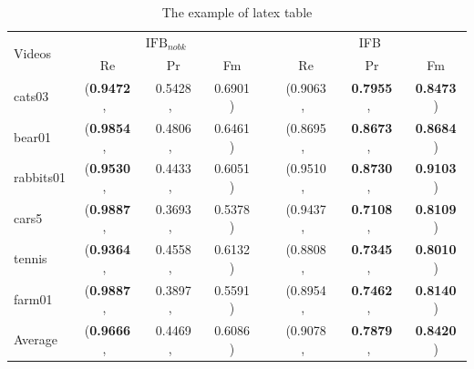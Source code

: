 \documentclass[journal]{IEEEtran}
\begin{document}
\begin{table}[!t]				%
    \caption{The example of latex table}
\label{tab_FBMS_nobk}
\centering
    \begin{tabular}{|l@{  }c@{  }c@{  }cc@{  }c@{  }c@{  }c|}
\hline
     \multirow{2}{*}{Videos} & \multicolumn{3}{c}{$\text{IFB}_{nobk}$} &  & \multicolumn{3}{c|}{IFB} \\
    \cline{2-4} \cline{6-8}
       & Re &Pr & Fm &  &  Re & Pr & Fm  \\
\hline
cats03          &   (\textbf{0.9472} ,\   &  0.5428 ,\  &   0.6901 )   &  &    (0.9063 ,\	 &  \textbf{0.7955} ,\	 &  \textbf{0.8473} )   \\
bear01          &   (\textbf{0.9854} ,\   &  0.4806 ,\  &   0.6461 )   &  &    (0.8695 ,\	 &  \textbf{0.8673} ,\	 &  \textbf{0.8684} )   \\
rabbits01       &   (\textbf{0.9530} ,\   &  0.4433 ,\  &   0.6051 )   &  &    (0.9510 ,\	 &  \textbf{0.8730} ,\	 &  \textbf{0.9103} )   \\
cars5           &   (\textbf{0.9887} ,\   &  0.3693 ,\  &   0.5378 )   &  &    (0.9437 ,\	 &  \textbf{0.7108} ,\	 &  \textbf{0.8109} )   \\
tennis          &   (\textbf{0.9364} ,\   &  0.4558 ,\  &   0.6132 )   &  &    (0.8808 ,\	 &  \textbf{0.7345} ,\	 &  \textbf{0.8010} )   \\
farm01          &   (\textbf{0.9887} ,\   &  0.3897 ,\  &   0.5591 )   &  &    (0.8954 ,\	 &  \textbf{0.7462} ,\	 &  \textbf{0.8140} )   \\
\hline                                                                                                           
Average         &   (\textbf{0.9666} ,\   &  0.4469 ,\  &   0.6086 )   &  &    (0.9078 ,\    &  \textbf{0.7879} ,\   &  \textbf{0.8420} )   \\
\hline
\end{tabular}
\end{table}

\end{document}
